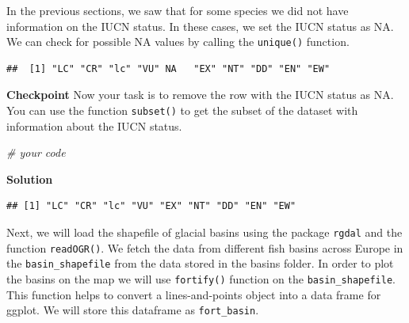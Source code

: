 \documentclass[
]{book}
\newenvironment{Shaded}{\begin{snugshade}}{\end{snugshade}}
\newcommand{\CommentTok}[1]{\textcolor[rgb]{0.56,0.35,0.01}{\textit{#1}}}
\newcommand{\KeywordTok}[1]{\textcolor[rgb]{0.13,0.29,0.53}{\textbf{#1}}}
\newcommand{\NormalTok}[1]{#1}
\newcommand{\OperatorTok}[1]{\textcolor[rgb]{0.81,0.36,0.00}{\textbf{#1}}}
\newcommand{\StringTok}[1]{\textcolor[rgb]{0.31,0.60,0.02}{#1}}
\begin{document}
In the previous sections, we saw that for some species we did not have information on the IUCN status. In these cases, we set the IUCN status as NA. We can check for possible NA values by calling the \texttt{unique()} function.

\begin{Shaded}
\end{Shaded}

\begin{verbatim}
##  [1] "LC" "CR" "lc" "VU" NA   "EX" "NT" "DD" "EN" "EW"
\end{verbatim}

\textbf{Checkpoint}
Now your task is to remove the row with the IUCN status as NA. You can use the function \texttt{subset()} to get the subset of the dataset with information about the IUCN status.

\begin{Shaded}
\begin{Highlighting}[]
\CommentTok{# your code}
\end{Highlighting}
\end{Shaded}

\textbf{Solution}

\begin{Shaded}
\end{Shaded}

\begin{verbatim}
## [1] "LC" "CR" "lc" "VU" "EX" "NT" "DD" "EN" "EW"
\end{verbatim}

Next, we will load the shapefile of glacial basins using the package \texttt{rgdal} and the function \texttt{readOGR()}. We fetch the data from different fish basins across Europe in the \texttt{basin\_shapefile} from the data stored in the basins folder. In order to plot the basins on the map we will use \texttt{fortify()} function on the \texttt{basin\_shapefile}. This function helps to convert a lines-and-points object into a data frame for ggplot. We will store this dataframe as \texttt{fort\_basin}.
\end{document}

